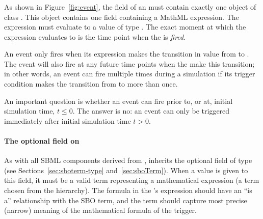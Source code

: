\begin{blockChanged}

\subsubsection{}
\label{sec:trigger}

As shown in Figure~\ref{fig:event}, the  field of
an \Event must contain exactly one object of class \Trigger.  This
object contains one  field containing a MathML
expression.  The expression must evaluate to a value of type
.  The exact moment at which the expression
evaluates to  is the time point when the \Event is
\emph{fired}.

An event only fires when its \Trigger expression makes the
transition in value from  to .  The event
will also fire at any future time points when the 
make this transition; in other words, an event can fire multiple
times during a simulation if its trigger condition makes the
transition from  to  more than once.

An important question is whether an event can fire prior to, or
at, initial simulation time, \ie $t \leq 0$.  The answer is no: an
event can only be triggered immediately after initial simulation
time \ie $t > 0$.


\paragraph{The optional  field on }
\label{sec:trigger-sboterm}

As with all SBML components derived from \SBase, \Trigger inherits
the optional field  of type  (see
Sections~\ref{sec:sboterm-type} and~\ref{sec:sboTerm}).  When a
value is given to this field, it must be a valid term representing
a mathematical expression (\ie a term chosen from the
\sbomathformula hierarchy).  The formula in the \Trigger's
 expression should have an ``is a'' relationship with
the SBO term, and the term should capture most precise (narrow)
meaning of the mathematical formula of the trigger.


\subsubsection{}
\label{sec:event-delay}


\end{blockChanged}
